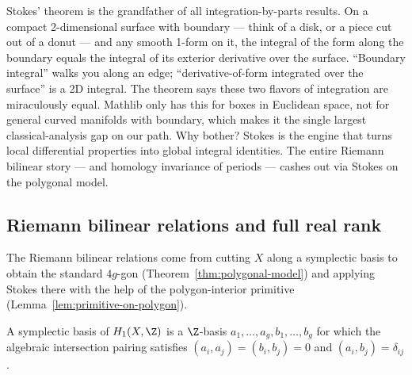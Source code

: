 \begin{layman}
Stokes' theorem is the grandfather of all integration-by-parts results.
On a compact 2-dimensional surface with boundary — think of a disk, or
a piece cut out of a donut — and any smooth 1-form on it, the integral
of the form along the boundary equals the integral of its exterior
derivative over the surface. ``Boundary integral'' walks you along an
edge; ``derivative-of-form integrated over the surface'' is a 2D
integral. The theorem says these two flavors of integration are
miraculously equal. Mathlib only has this for boxes in Euclidean space,
not for general curved manifolds with boundary, which makes it the
single largest classical-analysis gap on our path. Why bother? Stokes
is the engine that turns local differential properties into global
integral identities. The entire Riemann bilinear story — and homology
invariance of periods — cashes out via Stokes on the polygonal model.
\end{layman}

\subsection{Riemann bilinear relations and full real rank}

The Riemann bilinear relations come from cutting \(X\) along a
symplectic basis to obtain the standard \(4g\)-gon
(Theorem~\ref{thm:polygonal-model}) and applying Stokes there with
the help of the polygon-interior primitive
(Lemma~\ref{lem:primitive-on-polygon}).

\begin{definition}
\label{def:symplectic-basis}
A symplectic basis of \(H_1(X,\Z)\) is a \(\Z\)-basis
\(a_1,\dots,a_g,b_1,\dots,b_g\) for which the algebraic intersection
pairing satisfies
\((a_i,a_j)=(b_i,b_j)=0\) and \((a_i,b_j)=\delta_{ij}\).
\leanok
\end{definition}

